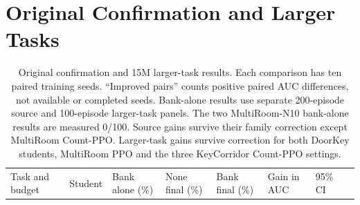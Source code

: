 \section{Original Confirmation and Larger
Tasks}\label{original-confirmation-and-larger-tasks}

\begin{longtable}[]{@{}
  >{\raggedright\arraybackslash}p{}
  >{\raggedright\arraybackslash}p{}
  >{\raggedleft\arraybackslash}p{}
  >{\raggedleft\arraybackslash}p{}
  >{\raggedleft\arraybackslash}p{}
  >{\raggedleft\arraybackslash}p{}
  >{\raggedright\arraybackslash}p{}
  >{\raggedright\arraybackslash}p{}@{}}
\caption{Original confirmation and 15M larger-task results. Each
comparison has ten paired training seeds. ``Improved pairs'' counts
positive paired AUC differences, not available or completed seeds.
Bank-alone results use separate 200-episode source and 100-episode
larger-task panels. The two MultiRoom-N10 bank-alone results are
measured 0/100. Source gains survive their family correction except
MultiRoom Count-PPO. Larger-task gains survive correction for both
DoorKey students, MultiRoom PPO and the three KeyCorridor Count-PPO
settings.}\tabularnewline
\toprule\noalign{}
\begin{minipage}[b]{\linewidth}\raggedright
Task and budget
\end{minipage} & \begin{minipage}[b]{\linewidth}\raggedright
Student
\end{minipage} & \begin{minipage}[b]{\linewidth}\raggedleft
Bank alone (\%)
\end{minipage} & \begin{minipage}[b]{\linewidth}\raggedleft
None final (\%)
\end{minipage} & \begin{minipage}[b]{\linewidth}\raggedleft
Bank final (\%)
\end{minipage} & \begin{minipage}[b]{\linewidth}\raggedleft
Gain in AUC
\end{minipage} & \begin{minipage}[b]{\linewidth}\raggedright
95\% CI
\end{minipage} & \begin{minipage}[b]{\linewidth}\raggedright

\end{minipage}
\end{longtable}
